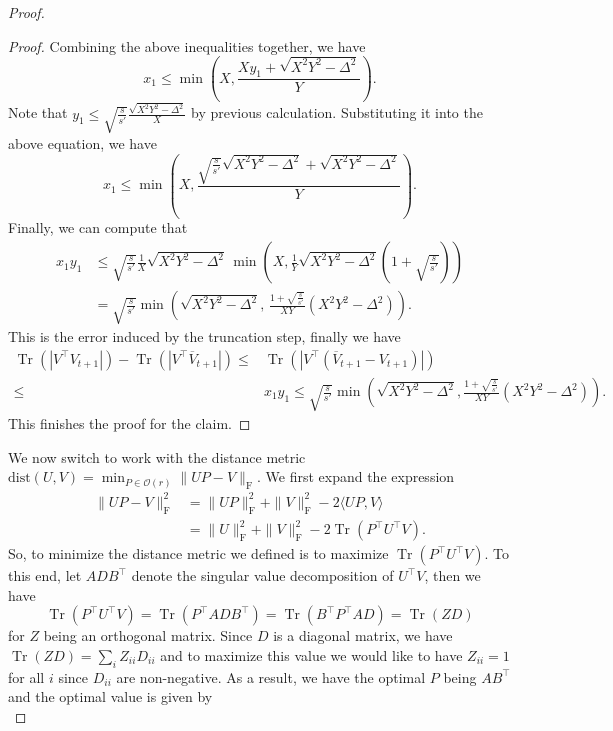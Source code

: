 \documentclass[11pt]{article}
\newcommand{\hs}{s'}
\newcommand{\scale}{V}
\newcommand{\gd}{\overline{V}}
\DeclareMathOperator{\Tr}{Tr}
\newcommand{\0}{{\mathbf{0}}}
\begin{document}
\begin{proof}
\begin{proof}
\par Combining the above inequalities together, we have 
\begin{equation*}
    x_1\leq \min\left( X,\frac{Xy_1+\sqrt{X^2Y^2-\Delta^2}}{Y} \right).
\end{equation*}
Note that $y_1\leq\sqrt{\frac{s}{\hs}}\frac{\sqrt{X^2Y^2-\Delta^2}}{X}$ by previous calculation. 
Substituting it into the above equation, we have
\begin{equation*}
    x_1\leq \min\left(X,\frac{\sqrt{\frac{s}{\hs}}{\sqrt{X^2Y^2-\Delta^2}}+\sqrt{X^2Y^2-\Delta^2}}{Y}
      \right).
\end{equation*}
Finally, we can compute that \begin{align*}
x_1y_1&\leq \sqrt{\frac{s}{\hs}}\frac{1}{X}\sqrt{X^2Y^2-\Delta^2}\,
\min\left(X,\frac{1}{Y}\sqrt{X^2Y^2-\Delta^2}(1+\sqrt{\frac{s}{\hs}})\right)\\
&=\sqrt{\frac{s}{\hs}}\min\left( \sqrt{X^2Y^2-\Delta^2},\,
\frac{1+\sqrt{\frac{s}{\hs}}}{XY}(X^2Y^2-\Delta^2) \right).
\end{align*}
This is the error induced by the truncation step, finally we have  \begin{align*}
    \Tr(|{\scale}^\top  V_{t+1}|)-  \Tr(|{\scale}^\top  \gd_{t+1}|)\leq&\Tr(|{\scale}^\top  (\gd_{t+1}-V_{t+1})|)\\\leq&x_1y_1\leq\sqrt{\frac{s}{\hs}}
      \min\left( \sqrt{X^2Y^2-\Delta^2},
    \frac{1+\sqrt{\frac{s}{\hs}}}{XY}(X^2Y^2-\Delta^2) \right).
\end{align*}
This finishes the proof for the claim.
\end{proof}
We now switch to work with the distance metric $\mathrm{dist}(U,V)=\min_{P\in{ \mathcal{O}(r)}}\|UP-V\|_\mathrm{F}$. 
We first expand the expression \begin{align*}
    \|UP-V\|_\mathrm{F}^2&=\|UP\|_\mathrm{F}^2+\|V\|_\mathrm{F}^2-2\langle UP,V\rangle\\
    &=\|U\|_\mathrm{F}^2+\|V\|_\mathrm{F}^2-2\Tr(P^\top  U^\top  V).
 \end{align*} 
So, to minimize the distance metric we defined is to maximize $\Tr(P^\top  U^\top  V)$. To this end, let $ADB^\top  $ denote the singular value decomposition of $U^\top  V$, then we have \begin{equation*}
    \Tr(P^\top  U^\top  V)=\Tr(P^\top  ADB^\top  )=\Tr(B^\top  P^\top  AD)=\Tr(ZD)
\end{equation*}
for $Z$ being an orthogonal matrix. Since $D$ is a diagonal matrix, we have $\Tr(ZD)=\sum_i Z_{ii}D_{ii}$ and to maximize this value we would like to have $Z_{ii}=1$ for all $i$ since $D_{ii}$ are non-negative. As a result, we have the optimal $P$ being $AB^\top  $ and the optimal value is given by\begin{equation*}

\end{equation*}
\end{proof}
\end{document}
